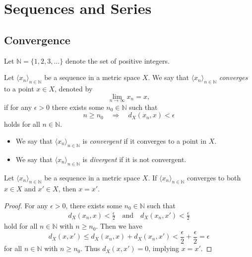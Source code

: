 \chapter{Sequences and Series}
\section{Convergence}
Let $\mathbb{N} = \{1, 2, 3, \dots\}$ denote the set of positive integers.
\begin{definition}
  Let $\langle x_n \rangle_{n \in \mathbb{N}}$ be a sequence in a metric space
  $X$.
  We say that $\langle x_n \rangle_{n \in \mathbb{N}}$ \emph{converges} to a
  point $x \in X$, denoted by
  \begin{equation*}
    \lim_{n \to \infty} x_n = x,
  \end{equation*}
  if for any $\epsilon > 0$ there exists some $n_0 \in \mathbb{N}$ such that
  \begin{equation*}
    n \geq n_0
    \quad \Rightarrow \quad
    d_X(x_n, x) < \epsilon
  \end{equation*}
  holds for all $n \in \mathbb{N}$.
  \begin{itemize}
    \item We say that $\langle x_n \rangle_{n \in \mathbb{N}}$ is
    \emph{convergent} if it converges to a point in $X$.
    \item We say that $\langle x_n \rangle_{n \in \mathbb{N}}$ is
    \emph{divergent} if it is not convergent.
  \end{itemize}
\end{definition}

\begin{theorem}
  Let $\langle x_n \rangle_{n \in \mathbb{N}}$ be a sequence in a metric space
  $X$.
  If $\langle x_n \rangle_{n \in \mathbb{N}}$ converges to both $x \in X$ and
  $x' \in X$, then $x = x'$.
\end{theorem}
\begin{proof}
  For any $\epsilon > 0$, there exists some $n_0 \in \mathbb{N}$ such that
  \begin{align*}
    d_X(x_n, x) < \frac{\epsilon}{2}
    \quad \text{and} \quad
    d_X(x_n, x') < \frac{\epsilon}{2}
  \end{align*}
  hold for all $n \in \mathbb{N}$ with $n \geq n_0$.
  Then we have
  \begin{equation*}
    d_X(x, x')
    \leq d_X(x_n, x) + d_X(x_n, x')
    < \frac{\epsilon}{2} + \frac{\epsilon}{2}
    = \epsilon
  \end{equation*}
  for all $n \in \mathbb{N}$ with $n \geq n_0$.
  Thus $d_X(x, x') = 0$, implying $x = x'$.
\end{proof}

